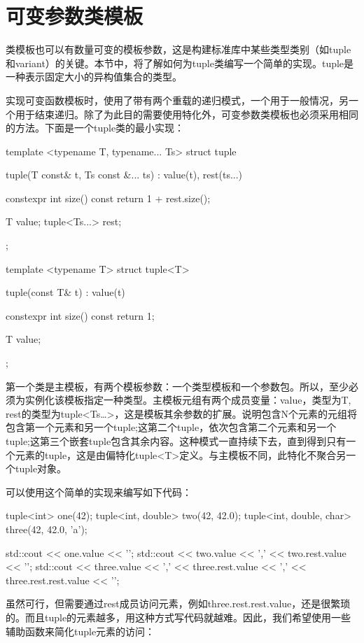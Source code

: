 \section{可变参数类模板}
类模板也可以有数量可变的模板参数，这是构建标准库中某些类型类别（如tuple和variant）的关键。本节中，将了解如何为tuple类编写一个简单的实现。tuple是一种表示固定大小的异构值集合的类型。

实现可变函数模板时，使用了带有两个重载的递归模式，一个用于一般情况，另一个用于结束递归。除了为此目的需要使用特化外，可变参数类模板也必须采用相同的方法。下面是一个tuple类的最小实现：

\begin{cpp}
template <typename T, typename... Ts>
struct tuple
{
	tuple(T const& t, Ts const &... ts)
	: value(t), rest(ts...)
	{
	}

	constexpr int size() const { return 1 + rest.size(); }
	
	T value;
	tuple<Ts...> rest;
};

template <typename T>
struct tuple<T>
{
	tuple(const T& t)
	: value(t)
	{
	}

	constexpr int size() const { return 1; }
	
	T value;
};
\end{cpp}

第一个类是主模板，有两个模板参数：一个类型模板和一个参数包。所以，至少必须为实例化该模板指定一种类型。主模板元组有两个成员变量：value，类型为T, rest的类型为tuple<Ts…>，这是模板其余参数的扩展。说明包含N个元素的元组将包含第一个元素和另一个tuple;这第二个tuple，依次包含第二个元素和另一个tuple;这第三个嵌套tuple包含其余内容。这种模式一直持续下去，直到得到只有一个元素的tuple，这是由偏特化tuple<T>定义。与主模板不同，此特化不聚合另一个tuple对象。

可以使用这个简单的实现来编写如下代码：

\begin{cpp}
tuple<int> one(42);
tuple<int, double> two(42, 42.0);
tuple<int, double, char> three(42, 42.0, 'a');

std::cout << one.value << '\n';
std::cout << two.value << ','
          << two.rest.value << '\n';
std::cout << three.value << ','
          << three.rest.value << ','
          << three.rest.rest.value << '\n';
\end{cpp}

虽然可行，但需要通过rest成员访问元素，例如three.rest.rest.value，还是很繁琐的。而且tuple的元素越多，用这种方式写代码就越难。因此，我们希望使用一些辅助函数来简化tuple元素的访问：

